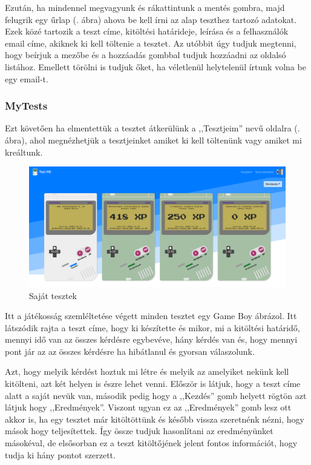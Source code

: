 Ezután, ha mindennel megvagyunk és rákattintunk a mentés gombra, majd felugrik egy űrlap (. ábra) ahova be kell írni az alap teszthez tartozó adatokat. Ezek közé tartozik a teszt címe, kitöltési határideje, leírása és a felhasználók email címe, akiknek ki kell töltenie a tesztet. Az utóbbit úgy tudjuk megtenni, hogy beírjuk a mezőbe és a hozzáadás gombbal tudjuk hozzáadni az oldalsó listához. Emellett törölni is tudjuk őket, ha véletlenül helytelenül írtunk volna be egy email-t.

\subsubsection{MyTests}

Ezt követően ha elmentettük a tesztet átkerülünk a ,,Tesztjeim'' nevű oldalra (. ábra), ahol megnézhetjük a tesztjeinket amiket ki kell töltenünk vagy amiket mi kreáltunk.

\begin{figure}[H]
	\centering
	\includegraphics[width=\linewidth]{images/my_tests.png}
	\caption{Saját tesztek}
	\label{fig:my_tests}
\end{figure}

\noindent Itt a játékosság szemléltetése végett minden tesztet egy Game Boy ábrázol. Itt látszódik rajta a teszt címe, hogy ki készítette és mikor, mi a kitöltési határidő, mennyi idő van az összes kérdésre egybevéve, hány kérdés van és, hogy mennyi pont jár az az összes kérdésre ha hibátlanul és gyorsan válaszolunk. \newline

Azt, hogy melyik kérdést hoztuk mi létre és melyik az amelyiket nekünk kell kitölteni, azt két helyen is észre lehet venni. Először is látjuk, hogy a teszt címe alatt a saját nevük van, második pedig hogy a ,,Kezdés'' gomb helyett rögtön azt látjuk hogy ,,Eredmények''. Viszont ugyan ez az ,,Eredmények'' gomb lesz ott akkor is, ha egy tesztet már kitöltöttünk és később vissza szeretnénk nézni, hogy mások hogy teljesítettek. Így össze tudjuk hasonlítani az eredményünket másokéval, de elsősorban ez a teszt kitöltőjének jelent fontos információt, hogy tudja ki hány pontot szerzett. \newline

